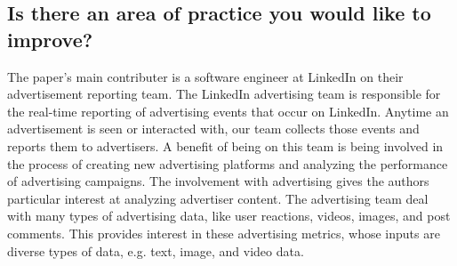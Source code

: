 \subsection{Is there an area of practice you would like to improve?}

The paper's main contributer is a software engineer at LinkedIn on their advertisement reporting team.  The LinkedIn advertising team is responsible for the real-time reporting of advertising events that occur on LinkedIn.  Anytime an advertisement is seen or interacted with, our team collects those events and reports them to advertisers.  A benefit of being on this team is being involved in the process of creating new advertising platforms and analyzing the performance of advertising campaigns.  The involvement with advertising gives the authors particular interest at analyzing advertiser content.  The advertising team deal with many types of advertising data, like user reactions, videos, images, and post comments. This provides interest in these advertising metrics, whose inputs are diverse types of data, e.g. text, image, and video data.

